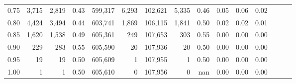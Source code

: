 \begin{tabular}{rrrrrrrrrrrrrrr}
0.75 &   3,715 &   2,819 &  0.43 &  599,317 &    6,293 &  102,621 &    5,335 &  0.46 &  0.05 &  0.06 &      0.02 \\
0.80 &   4,424 &   3,494 &  0.44 &  603,741 &    1,869 &  106,115 &    1,841 &  0.50 &  0.02 &  0.02 &      0.01 \\
0.85 &   1,620 &   1,538 &  0.49 &  605,361 &      249 &  107,653 &      303 &  0.55 &  0.00 &  0.00 &      0.00 \\
0.90 &     229 &     283 &  0.55 &  605,590 &       20 &  107,936 &       20 &  0.50 &  0.00 &  0.00 &      0.00 \\
0.95 &      19 &      19 &  0.50 &  605,609 &        1 &  107,955 &        1 &  0.50 &  0.00 &  0.00 &      0.00 \\
1.00 &       1 &       1 &  0.50 &  605,610 &        0 &  107,956 &        0 &   nan &  0.00 &  0.00 &      0.00 \\
\bottomrule
\end{tabular}
